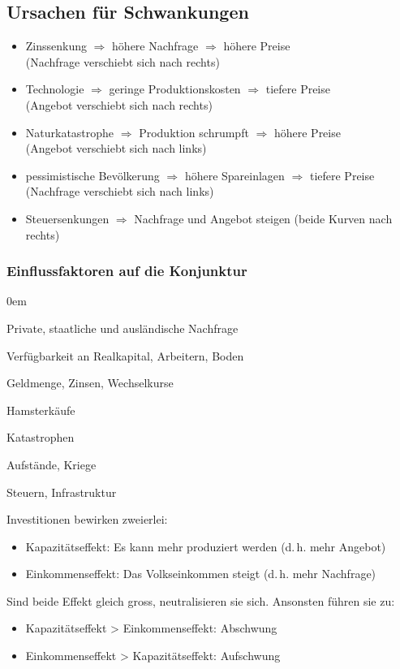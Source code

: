 \subsection{Ursachen für Schwankungen}
\begin{itemize}\itemsep0em
	\item Zinssenkung $\Rightarrow$ höhere Nachfrage $\Rightarrow$ höhere Preise\\
	(Nachfrage verschiebt sich nach rechts)
	\item Technologie $\Rightarrow$ geringe Produktionskosten $\Rightarrow$ tiefere Preise\\
	(Angebot verschiebt sich nach rechts)
	\item Naturkatastrophe $\Rightarrow$ Produktion schrumpft $\Rightarrow$ höhere Preise\\
	(Angebot verschiebt sich nach links)
	\item pessimistische Bevölkerung $\Rightarrow$ höhere Spareinlagen $\Rightarrow$ tiefere Preise\\
	(Nachfrage verschiebt sich nach links)
	\item Steuersenkungen $\Rightarrow$ Nachfrage und Angebot steigen (beide Kurven nach rechts)
\end{itemize}
 
\subsubsection{Einflussfaktoren auf die Konjunktur}
\begin{description}\itemsep0em
	\item [Nachfrageseitig] Private, staatliche und ausländische Nachfrage
	\item [Angebotsseitig] Verfügbarkeit an Realkapital, Arbeitern, Boden
	\item [Monetär] Geldmenge, Zinsen, Wechselkurse
	\item [Massenpsychologie] Hamsterkäufe
	\item [Ökologische Einflüsse] Katastrophen
	\item [Weltpolitische Situation] Aufstände, Kriege
	\item [Rahmenbedingungen] Steuern, Infrastruktur
\end{description}

Investitionen bewirken zweierlei:
\begin{itemize}\itemsep0em
	\item Kapazitätseffekt: Es kann mehr produziert werden (d.\,h. mehr Angebot)
	\item Einkommenseffekt: Das Volkseinkommen steigt (d.\,h. mehr Nachfrage)
\end{itemize}
Sind beide Effekt gleich gross, neutralisieren sie sich. Ansonsten führen sie zu:
\begin{itemize}\itemsep0em
	\item Kapazitätseffekt > Einkommenseffekt: Abschwung
	\item Einkommenseffekt > Kapazitätseffekt: Aufschwung
\end{itemize}

